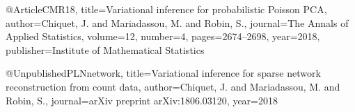 @Article{CMR18,
  title={Variational inference for probabilistic Poisson PCA},
  author={Chiquet, J. and Mariadassou, M. and Robin, S.},
  journal={The Annals of Applied Statistics},
  volume={12},
  number={4},
  pages={2674--2698},
  year={2018},
  publisher={Institute of Mathematical Statistics}
}

@Unpublished{PLNnetwork,
  title={Variational inference for sparse network reconstruction from count data},
  author={Chiquet, J. and Mariadassou, M. and Robin, S.},
  journal={arXiv preprint arXiv:1806.03120},
  year={2018}
}

